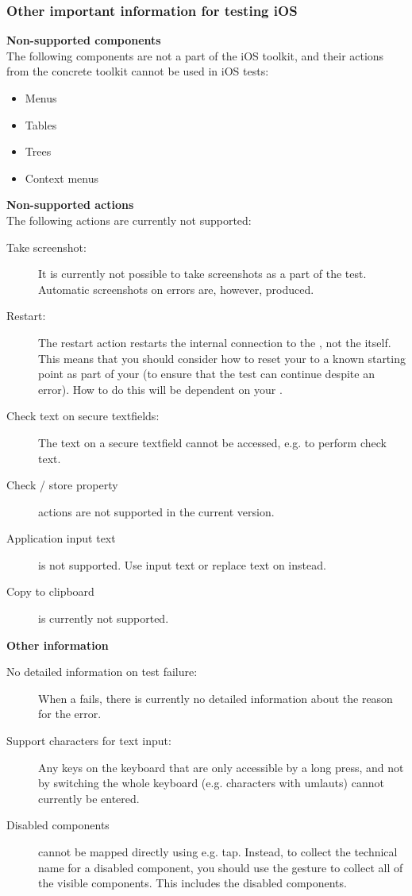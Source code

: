 \subsubsection{Other important information for testing iOS \gdauts{}}
\textbf{Non-supported components}\\
The following components are not a part of the iOS toolkit, and their actions from the concrete toolkit cannot be used in iOS tests:
\begin{itemize}
\item Menus
\item Tables
\item Trees
\item Context menus
\end{itemize}

\textbf{Non-supported actions}\\
The following actions are currently not supported:
\begin{description}
\item [Take screenshot:]{It is currently not possible to take screenshots as a part of the test. Automatic screenshots on errors are, however, produced.}
\item [Restart:]{The restart action restarts the internal connection to the \gdaut{}, not the \gdaut{} itself. This means that you should consider how to reset your \gdaut{} to a known starting point as part of your \gdehandlers{} (to ensure that the test can continue despite an error). How to do this will be dependent on your \gdaut{}.}
\item [Check text on secure textfields:]{The text on a secure textfield cannot be accessed, e.g. to perform check text.}
\item [Check / store property]{ actions are not supported in the current version.}
\item [Application input text]{ is not supported. Use input text or replace text on  instead.}
\item [Copy to clipboard]{ is currently not supported.}
\end{description}

\textbf{Other information}\\
\begin{description}
\item [No detailed information on test failure:]{When a \gdstep{} fails, there is currently no detailed information about the reason for the error.}
\item [Support characters for text input:]{Any keys on the keyboard that are only accessible by a long press, and not by switching the whole keyboard (e.g. characters with umlauts) cannot currently be entered.}
\item [Disabled components]{ cannot be mapped directly using e.g. tap. Instead, to collect the technical name for a disabled component, you should use the  gesture to collect all of the visible components. This includes the disabled components. }
\end{description}






